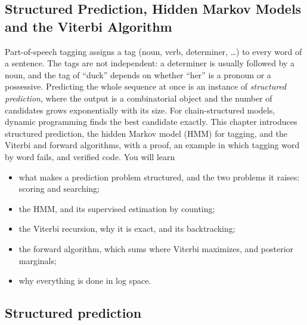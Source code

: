 \begin{notechapter}
\chapter{Structured Prediction, Hidden Markov Models and the Viterbi Algorithm}\label{ch:hmm-viterbi}

\begin{chapterintro}
Part-of-speech tagging assigns a tag (noun, verb, determiner, \ldots) to every word of a
sentence. The tags are not independent: a determiner is usually followed by a noun, and the
tag of ``duck'' depends on whether ``her'' is a pronoun or a possessive. Predicting the whole
sequence at once is an instance of \emph{structured prediction}, where the output is a
combinatorial object and the number of candidates grows exponentially with its size. For
chain-structured models, dynamic programming finds the best candidate exactly. This
chapter introduces structured prediction, the hidden Markov model (HMM) for tagging, and
the Viterbi and forward algorithms, with a proof, an example in which tagging word by word
fails, and verified code. You will learn
\begin{itemize}[nosep]
  \item what makes a prediction problem structured, and the two problems it raises: scoring
        and searching;
  \item the HMM, and its supervised estimation by counting;
  \item the Viterbi recursion, why it is exact, and its backtracking;
  \item the forward algorithm, which sums where Viterbi maximizes, and posterior marginals;
  \item why everything is done in log space.
\end{itemize}
\end{chapterintro}

\section{Structured prediction}\label{hmm-viterbi:sec:structured}


\end{notechapter}
